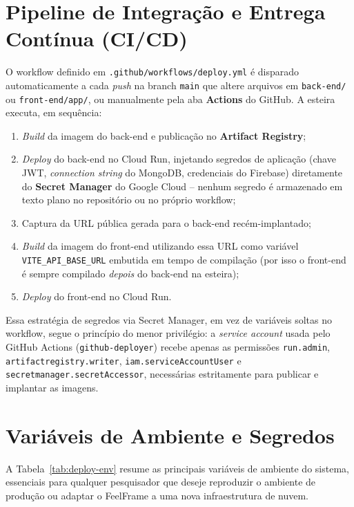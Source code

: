 \documentclass[
	12pt,
	openright,
	oneside,
	a4paper,
	english,
	brazil
	]{abntex2}
\begin{document}
\begin{apendicesenv}
\section{Pipeline de Integração e Entrega Contínua (CI/CD)}

O workflow definido em \texttt{.github/workflows/deploy.yml} é disparado automaticamente a cada \textit{push} na branch \texttt{main} que altere arquivos em \texttt{back-end/} ou \texttt{front-end/app/}, ou manualmente pela aba \textbf{Actions} do GitHub. A esteira executa, em sequência:

\begin{enumerate}
    \item \textit{Build} da imagem do back-end e publicação no \textbf{Artifact Registry};
    \item \textit{Deploy} do back-end no Cloud Run, injetando segredos de aplicação (chave JWT, \textit{connection string} do MongoDB, credenciais do Firebase) diretamente do \textbf{Secret Manager} do Google Cloud -- nenhum segredo é armazenado em texto plano no repositório ou no próprio workflow;
    \item Captura da URL pública gerada para o back-end recém-implantado;
    \item \textit{Build} da imagem do front-end utilizando essa URL como variável \texttt{VITE\_API\_BASE\_URL} embutida em tempo de compilação (por isso o front-end é sempre compilado \textit{depois} do back-end na esteira);
    \item \textit{Deploy} do front-end no Cloud Run.
\end{enumerate}

Essa estratégia de segredos via Secret Manager, em vez de variáveis soltas no workflow, segue o princípio do menor privilégio: a \textit{service account} usada pelo GitHub Actions (\texttt{github-deployer}) recebe apenas as permissões \texttt{run.admin}, \texttt{artifactregistry.writer}, \texttt{iam.serviceAccountUser} e \texttt{secretmanager.secretAccessor}, necessárias estritamente para publicar e implantar as imagens.

\section{Variáveis de Ambiente e Segredos}

A Tabela~\ref{tab:deploy-env} resume as principais variáveis de ambiente do sistema, essenciais para qualquer pesquisador que deseje reproduzir o ambiente de produção ou adaptar o FeelFrame a uma nova infraestrutura de nuvem.


\end{apendicesenv}
\end{document}
